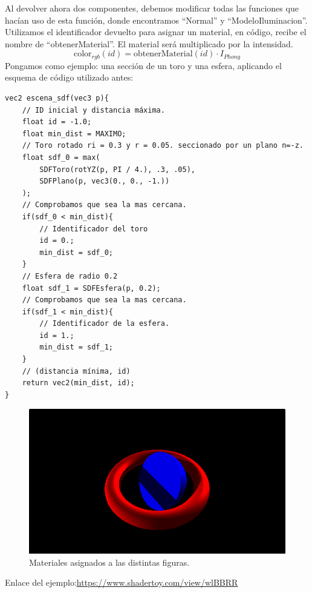 Al devolver ahora dos componentes, debemos modificar todas las funciones que hacían uso de esta función, donde encontramos \enquote{Normal} y \enquote{ModeloIluminacion}. Utilizamos el identificador devuelto para asignar un material, en código, recibe el nombre de \enquote{obtenerMaterial}. El material será multiplicado por la intensidad.
\[ \text{color}_{rgb}(id) = \text{obtenerMaterial}(id) \cdot I_{Phong} \]
Pongamos como ejemplo: una sección de un toro y una esfera, aplicando el esquema de código utilizado antes:

\begin{lstlisting}
vec2 escena_sdf(vec3 p){
    // ID inicial y distancia máxima.
    float id = -1.0;
    float min_dist = MAXIMO;
    // Toro rotado ri = 0.3 y r = 0.05. seccionado por un plano n=-z.
    float sdf_0 = max(
        SDFToro(rotYZ(p, PI / 4.), .3, .05),
        SDFPlano(p, vec3(0., 0., -1.))
    );
    // Comprobamos que sea la mas cercana.
    if(sdf_0 < min_dist){
        // Identificador del toro
        id = 0.;
        min_dist = sdf_0;
    }
    // Esfera de radio 0.2
    float sdf_1 = SDFEsfera(p, 0.2);
    // Comprobamos que sea la mas cercana.
    if(sdf_1 < min_dist){
        // Identificador de la esfera.
        id = 1.;
        min_dist = sdf_1;
    }
    // (distancia mínima, id)
    return vec2(min_dist, id);
}
\end{lstlisting}

\begin{figure}[H]
  \centering
  \captionsetup{justification=centering}%
  \includegraphics[width=1.0\textwidth]{secciones/imagenes/material/materiales.png}
  \caption{Materiales asignados a las distintas figuras.}
  \label{fig:material}
\end{figure}

Enlace del ejemplo:\url{https://www.shadertoy.com/view/wlBBRR}

